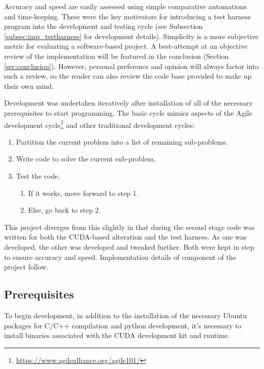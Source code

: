 \documentclass[conference]{IEEEtran}
\begin{document}
Accuracy and speed are easily assessed using simple comparative automations and time-keeping. These were the key motivators for introducing a test harness program into the development and testing cycle (see Subsection \ref{subsec:imp_testharness} for development details). Simplicity is a more subjective metric for evaluating a software-based project. A best-attempt at an objective review of the implementation will be featured in the conclusion (Section \ref{sec:conclusion}). However, personal preference and opinion will always factor into such a review, so the reader can also review the code base provided to make up their own mind.

Development was undertaken iteratively after installation of all of the necessary prerequisites to start programming. The basic cycle mimics aspects of the Agile development cycle\footnote{\url{https://www.agilealliance.org/agile101/}} and other traditional development cycles:

\begin{enumerate}
    \item Partition the current problem into a list of remaining sub-problems.
    \item Write code to solve the current sub-problem.
    \item Test the code.
    \begin{enumerate}
        \item If it works, move forward to step 1.
        \item Else, go back to step 2.
    \end{enumerate}
\end{enumerate}

This project diverges from this slightly in that during the second stage code was written for both the CUDA-based alteration and the test harness. As one was developed, the other was developed and tweaked further. Both were kept in step to ensure accuracy and speed. Implementation details of component of the project follow.


\subsection{Prerequisites}
\label{subsec:imp_prerequisites}

To begin development, in addition to the installation of the necessary Ubuntu packages for C/C++ compilation and python development, it's necessary to install binaries associated with the CUDA development kit and runtime.
\end{document}
